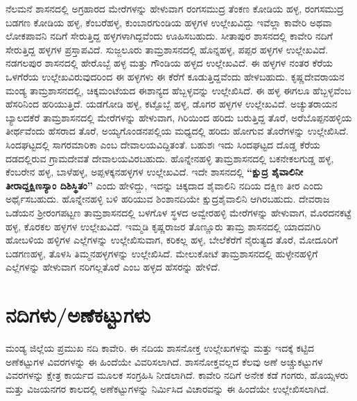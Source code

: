 ನೆಲಮನೆ ಶಾಸನದಲ್ಲಿ ಅಗ್ರಹಾರದ ಮೇರೆಗಳನ್ನು ಹೇಳುವಾಗ ರಂಗಸಮುದ್ರ ತೆಂಕಣ ಕೋಡಿಯ ಹಳ್ಳ, ರಂಗಸಮುದ್ರ ಬಡಗಣ ಕೋಡಿಯ ಹಳ್ಳ, ಕೆಂಬರೆಹಳ್ಳ, ಕುಂಬಾರಗುಂಡಿಯ ಹಳ್ಳಗಳ ಉಲ್ಲೇಖವಿದ್ದು ಇವೆಲ್ಲಾ ಕಾವೇರಿ ಅಥವಾ ಲೋಕಪಾವನಿ ನದಿಗೆ ಸೇರುತ್ತಿದ್ದ ಹಳ್ಳಗಳಾಗಿದ್ದವೆಂದು ಊಹಿಸಬಹುದು. ಸೀತಾಪುರ ಶಾಸನದಲ್ಲಿ ಕಾವೇರಿ ನದಿಗೆ ಸೇರುತ್ತಿದ್ದ ಹಳ್ಳಗಳ ಪ್ರಸ್ತಾಪವಿದೆ. ಸುಜ್ಜಲೂರು ತಾಮ್ರಶಾಸನದಲ್ಲಿ ಹೊನ್ನಹಳ್ಳ, ಪಪ್ಪರ ಹಳ್ಳಗಳ ಉಲ್ಲೇಖವಿದೆ. ನಡಗಲಪುರ ಶಾಸನದಲ್ಲಿ ಹೇರೊಬ್ಬೆ ಹಳ್ಳ ಮತ್ತು ಗೌಂಡಿಯ ಹಳ್ಳದ ಉಲ್ಲೇಖವಿದೆ. ಈ ಹಳ್ಳಗಳ ನಂತರ ಕೆರೆಯ ಒಳಗೆರೆಯ ಉಲ್ಲೇಖವಿರುವುದರಿಂದ ಈ ಹಳ್ಳಗಳು ಈ ಕೆರೆಗೆ ಕೂಡುತ್ತಿದ್ದವೆಂದು ಹೇಳಬಹುದು. ಕೃಷ್ಣದೇವರಾಯನ ಮಂಡ್ಯ ತಾಮ್ರಶಾಸನದಲ್ಲಿ, ಚಿಕ್ಕಮಂಟೆಯದ ಈಶಾನ್ಯದ ಹೆಬ್ಬಳ್ಳವನ್ನು ಉಲ್ಲೇಖಿಸಿದೆ. ಈ ಹಳ್ಳ ಈಗಲೂ ಹೆಬ್ಬಳ್ಳವೆಂಬ ಹೆಸರಿನಿಂದ ಹರಿಯುತ್ತಿದೆ. ಯಡಗೋಡಿ ಹಳ್ಳ, ಕಟ್ಟೊಬ್ಬೆ ಹಳ್ಳ, ಡೊಗರ ಹಳ್ಳಗಳ ಉಲ್ಲೇಖವಿದೆ. ಅಚ್ಯುತರಾಯನ ಬ್ಯಾಲದಕೆರೆ ತಾಮ್ರಶಾಸನದಲ್ಲಿ ಮೇರೆಗಳನ್ನು ಹೇಳುವಾಗ, ಗಿರಿಯಿಂದ ಹರಿದು ಬರುತ್ತಿದ್ದ ತೊರೆ, ಅರೆಬೊಪ್ಪನಹಳ್ಳಿಯ ತೀರ್ಥವೆಂದು ಹೆಸರಾದ ತೊರೆ, ಅಯ್ಯಗೊಂಡನಪಲ್ಲಿಯ ಮಧ್ಯದಲ್ಲಿ ಹರಿದು ಹೋಗುವ ತೊರೆಗಳನ್ನು ಉಲ್ಲೇಖಿಸಿದೆ. ಸಿಂದಘಟ್ಟದಲ್ಲಿ ಸಾಗರಮಾರಿಕಾ ಎಂಬ ದೇವಾಲಯವಿದ್ದಿತಂತೆ. ಬಹುಶಃ ಇದು ಸಿಂದಘಟ್ಟದ ದೊಡ್ಡ ಕೆರೆಯ ದಡದಲ್ಲಿರುವ ಗ್ರಾಮದೇವತೆ ದೇವಾಲಯವಿರಬಹುದು. ಹೊನ್ನೇನಹಳ್ಳಿ ತಾಮ್ರಶಾಸನದಲ್ಲಿ ಬಕನೇಕಲಗುಡ್ಡ ಹಳ್ಳ, ಕೆಂಬರೇನ ಹಳ್ಳ, ಬಾಳೆಹಳ್ಳ, ಅಪ್ಪಳಕ್ಕನಹಳ್ಳಗಳ ಉಲ್ಲೇಖವಿದೆ. ಇದೇ ಶಾಸನದಲ್ಲಿ \textbf{“ಕ್ಷುದ್ರ ಶೈವಾಲಿನೀ ತೀರಾದ್ದಕ್ಷಿಣಸ್ಯಾಂ ದಿಶಿಸ್ಥಿತಂ”} ಎಂದು ಹೇಳಿದ್ದು, ಇದನ್ನು ಚಿಕ್ಕದಾದ ಶೈವಾಲಿನಿ ನದಿಯ ದಕ್ಷಿಣ ತೀರ ಎಂದು ಅರ್ಥೈಸಬಹುದು. ಹೊನ್ನೇನಹಳ್ಳಿ ಬಳಿ ಹರಿಯುವ ಶಿಂಶಾನದಿಯೇ ಕ್ಷುದ್ರಶೈವಾಲಿನಿ ಆಗಿರಬಹುದು. ದೇವರಾಜ ಒಡೆಯನ ಶ‍್ರೀರಂಗಪಟ್ಟಣ ತಾಮ್ರಶಾಸನದಲ್ಲಿ ಬಳಗೊಳ ಸ್ಥಳದ ಅವ್ವೇರಹಳ್ಳಿ ಮೇರೆಗಳನ್ನು ಹೇಳುವಾಗ, ಮೊರದನಕಟ್ಟೆ ಹಳ್ಳ, ಕೊರಕಲ ಹಳ್ಳಗಳ ಉಲ್ಲೇಖವಿದೆ. ಇಮ್ಮಡಿ ಕೃಷ್ಣರಾಜರ ತೊಣ್ಣೂರು ತಾಮ್ರ ಶಾಸನದಲ್ಲಿ ಯಾದವಗಿರಿ ಹೋಬಳಿಯ ಹಳ್ಳಿಗಳ ಎಲ್ಲೆಗಳನ್ನು ಉಲ್ಲೇಖಿಸುವಾಗ, ಕರಿಕಲ್ಲ ಹಳ್ಳ, ಬೇಲೆಕೆರೆಗೆ ನೈರುತ್ಯದ ತೊರೆ, ಮೋದೂರಿಗೆ ಬಡಗಣಹಳ್ಳ, ತೊಳಸಿ ತಿಮ್ಮನಹಳ್ಳಗಳನ್ನು ಉಲ್ಲೇಖಿಸಿದೆ. ಮೇಲುಕೋಟೆ ತಾಮ್ರಶಾಸನದಲ್ಲಿ ಹುಳ್ಳೇನಹಳ್ಳಿಗೆ ಎಲ್ಲೆಗಳನ್ನು ಹೇಳುವಾಗ ನರಿಗಲ್ಲತೊರೆ ಎಂಬ ಹಳ್ಳದ ಹೆಸರನ್ನು ಹೇಳಿದೆ.

\vskip 5pt

\section{ನದಿಗಳು/ಅಣೆಕಟ್ಟುಗಳು}

ಮಂಡ್ಯ ಜಿಲ್ಲೆಯ ಪ್ರಮುಖ ನದಿ ಕಾವೇರಿ. ಈ ನದಿಯ ಶಾಸನೋಕ್ತ ಉಲ್ಲೇಖಗಳನ್ನು ಮತ್ತು ಇದಕ್ಕೆ ಕಟ್ಟಿದ ಅಣೆಕಟ್ಟುಗಳ ವಿವರಗಳನ್ನು ಈ ಹಿಂದೆಯೇ ವಿವರಿಸಲಾಗಿದೆ. ಶಾಸನೋಕ್ತವಲ್ಲದ ಕೆಲವು ಅಣೆ ಅಚ್ಚುಕಟ್ಟುಗಳ ವಿವರಗಳನ್ನು ಕ್ಷೇತ್ರ ಕಾರ್ಯದ ಮೂಲಕ ಸಂಗ್ರಹಿಸಿ ನೀಡಲಾಗಿದೆ. ಕಾವೇರಿ ನದಿಗೆ ಅನೇಕ ಕಡೆ ಗಂಗರು, ಹೊಯ್ಸಳರು ಮತ್ತು ವಿಜಯನಗರ ಕಾಲದಲ್ಲಿ ಅಣೆಕಟ್ಟುಗಳನ್ನು ನಿರ್ಮಿಸಿದ ವಿಚಾರವನ್ನು ಈ ಹಿಂದೆಯೇ ಉಲ್ಲೇಖಿಸಲಾಗಿದೆ.

